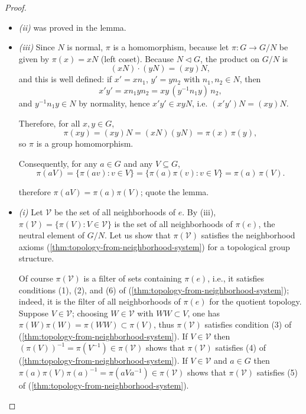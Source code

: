 \begin{proof}~

    \begin{itemize}
        \item  \textit{(ii)} was proved in the lemma.
        \item \textit{(iii)} Since \(N\) is normal, \(\pi\) is a homomorphism, because
              let $\pi:G\to G/N$ be given by $\pi(x)=xN$ (left coset). Because $N\lhd G$, the product on $G/N$ is
              \[
                  (xN)\cdot(yN)=(xy)N,
              \]
              and this is well defined: if $x'=xn_1$, $y'=yn_2$ with $n_1,n_2\in N$, then
              \[
                  x'y' = x n_1 y n_2
                  = x y \,(y^{-1} n_1 y)\, n_2,
              \]
              and $y^{-1} n_1 y\in N$ by normality, hence $x'y'\in xyN$, i.e. $(x'y')N=(xy)N$.

              Therefore, for all $x,y\in G$,
              \[
                  \pi(xy)=(xy)N=(xN)(yN)=\pi(x)\,\pi(y),
              \]
              so $\pi$ is a group homomorphism.

              Consequently, for any $a\in G$ and any $V\subseteq G$,
              \[
                  \pi(aV)=\{\pi(av):v\in V\}
                  =\{\pi(a)\pi(v):v\in V\}
                  =\pi(a)\,\pi(V).
              \]


              therefore \(\pi(aV) = \pi(a)\pi(V)\); quote the lemma.
        \item \textit{(i)} Let \(\mathcal{V}\) be the set of all neighborhoods of \(e\). By (iii),
              \(\pi(\mathcal{V}) = \{ \pi(V) : V \in \mathcal{V} \}\) is the set of all neighborhoods of \(\pi(e)\),
              the neutral element of \(G/N\). Let us show that \(\pi(\mathcal{V})\) satisfies the neighborhood axioms (\ref{thm:topology-from-neighborhood-system})
              for a topological group structure.

              Of course \(\pi(\mathcal{V})\) is a filter of sets containing \(\pi(e)\), i.e., it satisfies conditions (1), (2), and (6)
              of (\ref{thm:topology-from-neighborhood-system}); indeed, it is the filter of all neighborhoods of \(\pi(e)\) for the quotient topology.
              Suppose \(V \in \mathcal{V}\); choosing \(W \in \mathcal{V}\) with \(WW \subset V\),
              one has \(\pi(W)\pi(W) = \pi(WW) \subset \pi(V)\), thus \(\pi(\mathcal{V})\) satisfies condition (3) of (\ref{thm:topology-from-neighborhood-system}).
              If \(V \in \mathcal{V}\) then \((\pi(V))^{-1} = \pi(V^{-1}) \in \pi(\mathcal{V})\) shows that
              \(\pi(\mathcal{V})\) satisfies (4) of (\ref{thm:topology-from-neighborhood-system}). If \(V \in \mathcal{V}\) and \(a \in G\) then
              \(\pi(a)\pi(V)\pi(a)^{-1} = \pi(aVa^{-1}) \in \pi(\mathcal{V})\) shows that \(\pi(\mathcal{V})\)
              satisfies (5) of (\ref{thm:topology-from-neighborhood-system}).


\end{itemize}
\end{proof}
